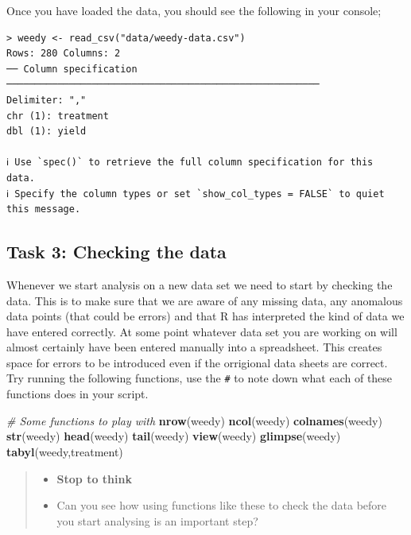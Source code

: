 \documentclass[
]{book}
\newenvironment{Shaded}{\begin{snugshade}}{\end{snugshade}}
\newcommand{\CommentTok}[1]{\textcolor[rgb]{0.56,0.35,0.01}{\textit{#1}}}
\newcommand{\FunctionTok}[1]{\textcolor[rgb]{0.13,0.29,0.53}{\textbf{#1}}}
\newcommand{\NormalTok}[1]{#1}
\providecommand{\tightlist}{%
  \setlength{\itemsep}{0pt}\setlength{\parskip}{0pt}}
\begin{document}
Once you have loaded the data, you should see the following in your console;

\begin{verbatim}
> weedy <- read_csv("data/weedy-data.csv")
Rows: 280 Columns: 2                                                         
── Column specification ───────────────────────────────────────────────────────
Delimiter: ","
chr (1): treatment
dbl (1): yield

ℹ Use `spec()` to retrieve the full column specification for this data.
ℹ Specify the column types or set `show_col_types = FALSE` to quiet this message.
\end{verbatim}

\subsection{Task 3: Checking the data}\label{checking-the-data}

Whenever we start analysis on a new data set we need to start by checking the data. This is to make sure that we are aware of any missing data, any anomalous data points (that could be errors) and that R has interpreted the kind of data we have entered correctly. At some point whatever data set you are working on will almost certainly have been entered manually into a spreadsheet. This creates space for errors to be introduced even if the orrigional data sheets are correct. Try running the following functions, use the \texttt{\#} to note down what each of these functions does in your script.

\begin{Shaded}
\begin{Highlighting}[]
\CommentTok{\# Some functions to play with}
\FunctionTok{nrow}\NormalTok{(weedy)}
\FunctionTok{ncol}\NormalTok{(weedy)}
\FunctionTok{colnames}\NormalTok{(weedy)}
\FunctionTok{str}\NormalTok{(weedy)}
\FunctionTok{head}\NormalTok{(weedy)}
\FunctionTok{tail}\NormalTok{(weedy)}
\FunctionTok{view}\NormalTok{(weedy)}
\FunctionTok{glimpse}\NormalTok{(weedy)}
\FunctionTok{tabyl}\NormalTok{(weedy,treatment)}
\end{Highlighting}
\end{Shaded}

\begin{quote}
\begin{itemize}
\tightlist
\item
  \textbf{Stop to think}
\item
  Can you see how using functions like these to check the data before you start analysing is an important step?
\end{itemize}
\end{quote}
\end{document}
